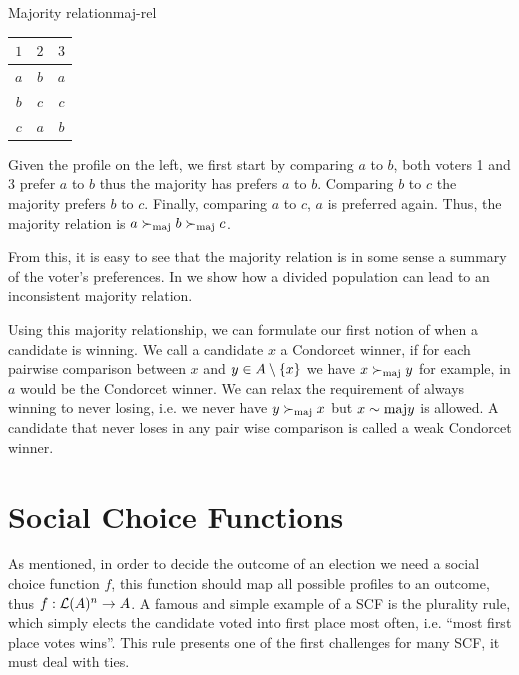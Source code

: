 \begin{example}{Majority relation}{maj-rel}
	\begin{minipage}{0.15\linewidth}
		\begin{tabular}{ccc}
			\toprule
			$1$ & $2$ & $3$ \\
			\midrule
			$a$ & $b$ & $a$ \\
			$b$ & $c$ & $c$ \\
			$c$ & $a$ & $b$ \\
			\bottomrule
		\end{tabular}
	\end{minipage}
	\hspace{0.02\linewidth}
	\begin{minipage}{0.78\linewidth}
		Given the profile on the left, we
		first start by comparing $a$ to $b$, both voters 1 and 3 prefer
		$a$ to $b$ thus the majority has prefers $a$ to $b$. Comparing
		$b$ to $c$ the majority prefers $b$ to $c$. Finally, comparing
		$a$ to $c$, $a$ is preferred again. Thus, the majority relation
		is $a \succ_{\textnormal{maj}} b \succ_{\textnormal{maj}} c$.
	\end{minipage}
\end{example}

From this, it is easy to see that the majority relation is in some sense a
summary of the voter's preferences. In 
we show how a divided population can lead to an inconsistent majority relation.

Using this majority relationship, we can formulate our first notion of when a
candidate is winning. We call a candidate $x$ a Condorcet winner, if for
each pairwise comparison between $x$ and $y \in A\setminus
	\{x\}$ we have $x \succ_{\textnormal{maj}} y$ for example, in  $a$ would be
the Condorcet winner. We can relax the requirement of always winning to never
losing, i.e. we never have $y \succ_{\textnormal{maj}} x$ but $x \sim{\textnormal{maj}} y$ is allowed. A
candidate that never loses in any pair wise comparison is called a weak
Condorcet winner.

\section{Social Choice Functions} \label{sec:SCF}

As mentioned, in order to decide the outcome of an election we need a social
choice function $f$, this function should map all possible profiles to an
outcome, thus $f: \mathcal{L}(A)^n \to A$. A famous and
simple example of a SCF is the plurality rule, which simply elects the
candidate voted into first place most often, i.e. ``most first place votes
wins''. This rule presents one of the first challenges for many SCF, it must deal with ties.

